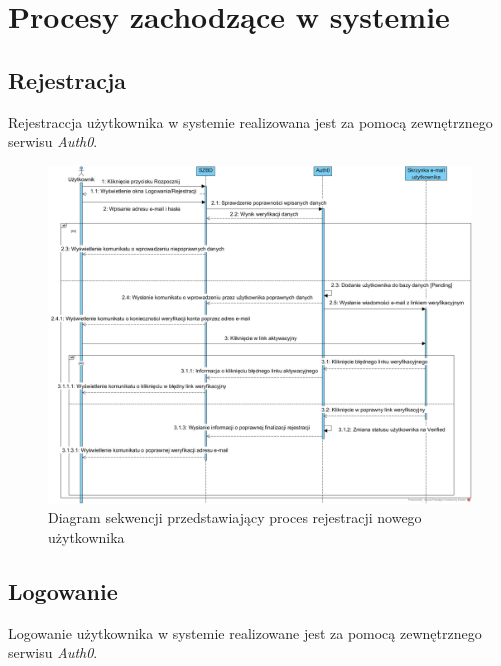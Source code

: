 \chapter{Procesy zachodzące w systemie}
\section{Rejestracja}
Rejestraccja użytkownika w systemie realizowana jest za pomocą zewnętrznego serwisu \textit{Auth0}. 

\begin{figure}[h]
	\centering\includegraphics[scale=0.25]{images/sequence_diagram3.jpg}
	\caption{Diagram sekwencji przedstawiający proces rejestracji nowego użytkownika}
	\label{Rys:registration}
\end{figure}

\newpage

\section{Logowanie}
Logowanie użytkownika w systemie realizowane jest za pomocą zewnętrznego serwisu \textit{Auth0}.

